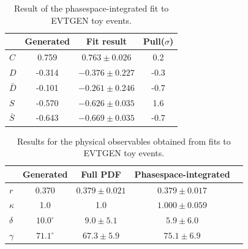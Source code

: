 \begin{table}[h]
\caption{Result of the phasespace-integrated fit to \textsf{EVTGEN} toy events.} 		
  \centering
  \begin{tabular}
    {l c c c}
    \hline \hline
    & Generated &  Fit result  & Pull($\sigma$) \\   \hline
    $C$ & 0.759  &  $0.763 \pm 0.026 $  & 0.2 	 \\
    $D$ &  -0.314 &  $-0.376 \pm 0.227$ & -0.3	 \\
    $\bar D$ &  -0.101 &  $-0.261 \pm 0.246$ & -0.7	 \\
    $S$ &   -0.570 &  $-0.626 \pm 0.035$	& 1.6 \\
    $\bar S$ &  -0.643   &  $-0.669\pm 0.035$ & -0.7	 \\
    \hline \hline
  \end{tabular}
    \label{tab:FitGenMC}
\end{table}


\begin{table}[h]
\caption{Results for the physical observables obtained from fits to \textsf{EVTGEN} toy events.} 		
  \centering
  \begin{tabular}
    {l c c c c}
    \hline \hline
    & Generated &  Full PDF     &   Phasespace-integrated  \\   \hline
	$r$ & 0.370 & $0.379 \pm 0.021 $ & $0.379 \pm 0.017$  \\
	$\kappa$  &1.0 & 1.0 &  $1.000 \pm  0.059$  \\
	$\delta$ & $10.0^\circ$ &  $9.0 \pm  5.1$ & $5.9 \pm  6.0$   \\
	$\gamma$ & $71.1^\circ$ &   $67.3 \pm 5.9$ &  $75.1 \pm 6.9$\\
    \hline \hline
  \end{tabular}
      \label{tab:FitGenMC3}
\end{table}

